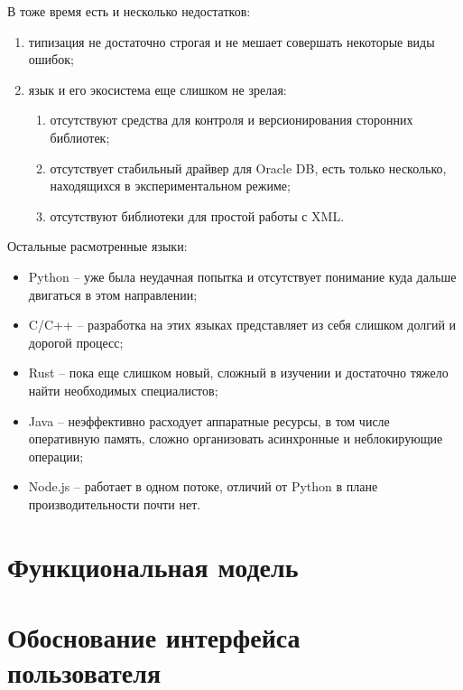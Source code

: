 В тоже время есть и несколько недостатков:
\begin{enumerate}
    \item типизация не достаточно строгая и не мешает совершать некоторые виды ошибок; %
    \item язык и его экосистема еще слишком не зрелая: %
    \begin{enumerate}
        \item отсутствуют средства для контроля и версионирования сторонних библиотек;
        \item отсутствует стабильный драйвер для Oracle DB, есть только несколько, находящихся в экспериментальном режиме;
        \item отсутствуют библиотеки для простой работы с XML\@.
    \end{enumerate}
\end{enumerate}

Остальные расмотренные языки:
\begin{itemize}
    \item Python -- уже была неудачная попытка и отсутствует понимание куда дальше двигаться в этом направлении;
    \item C/C++ -- разработка на этих языках представляет из себя слишком долгий и дорогой процесс; %
    \item Rust -- пока еще слишком новый, сложный в изучении и достаточно тяжело найти необходимых специалистов;
    \item Java -- неэффективно расходует аппаратные ресурсы, в том числе оперативную память,
    сложно организовать асинхронные и неблокирующие операции;
    \item Node.js -- работает в одном потоке, отличий от Python в плане производительности почти нет.
\end{itemize}

\section{Функциональная модель}



\section{Обоснование интерфейса пользователя}

